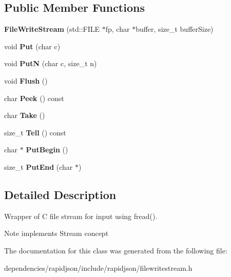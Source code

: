 \subsection*{Public Member Functions}
\begin{DoxyCompactItemize}
\item 
\mbox{\label{class_file_write_stream_a553ea3e7377a7f7cace2daa3cc90e1a1}} 
{\bfseries File\+Write\+Stream} (std\+::\+F\+I\+LE $\ast$fp, char $\ast$buffer, size\+\_\+t buffer\+Size)
\item 
\mbox{\label{class_file_write_stream_af6a6061d0accd939fa475b9b34427d85}} 
void {\bfseries Put} (char c)
\item 
\mbox{\label{class_file_write_stream_ad9ec108b24316a2c1c83c6ddc75d308a}} 
void {\bfseries PutN} (char c, size\+\_\+t n)
\item 
\mbox{\label{class_file_write_stream_a939fbf183ba36464c5e0837df4329d37}} 
void {\bfseries Flush} ()
\item 
\mbox{\label{class_file_write_stream_ab556c7e26346ddff0e579a53c09c3a13}} 
char {\bfseries Peek} () const
\item 
\mbox{\label{class_file_write_stream_ac927a0ae09a85eaba58a74ceb04b40ed}} 
char {\bfseries Take} ()
\item 
\mbox{\label{class_file_write_stream_a06272de32d6ac4d10c9bd5deb79a0234}} 
size\+\_\+t {\bfseries Tell} () const
\item 
\mbox{\label{class_file_write_stream_a4d1340a64fde3f16ac2afce19537c75e}} 
char $\ast$ {\bfseries Put\+Begin} ()
\item 
\mbox{\label{class_file_write_stream_a54b14047e4c998db0594290605f8f0dc}} 
size\+\_\+t {\bfseries Put\+End} (char $\ast$)
\end{DoxyCompactItemize}


\subsection{Detailed Description}
Wrapper of C file stream for input using fread(). 

\begin{DoxyNote}{Note}
implements Stream concept 
\end{DoxyNote}


The documentation for this class was generated from the following file\+:\begin{DoxyCompactItemize}
\item 
dependencies/rapidjson/include/rapidjson/filewritestream.\+h\end{DoxyCompactItemize}
